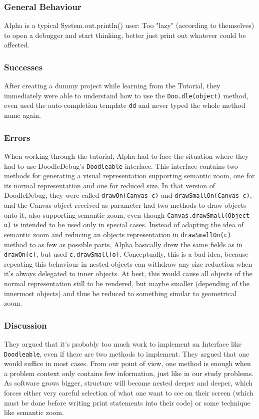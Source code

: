 \documentclass[a4paper,ngerman,english]{amsbook} %
\begin{document}
\subsubsection*{General Behaviour}
Alpha is a typical System.out.println() user: Too "lazy" (according to themselves) to open a debugger and start thinking, better just print out whatever could be affected.
\subsubsection*{Successes}
After creating a dummy project while learning from the Tutorial, they immediately were able to understand how to use the \verb-Doo.dle(object)- method, even used the auto-completion template \verb.dd. and never typed the whole method name again.
\subsubsection*{Errors}
When working through the tutorial, Alpha had to face the situation where they had to use DoodleDebug's \verb.Doodleable. interface. This interface contains two methods for generating a visual representation supporting semantic zoom, one for its normal representation and one for reduced size. In that version of DoodleDebug, they were called \verb.drawOn(Canvas c). and \verb.drawSmallOn(Canvas c)., and the Canvas object received as parameter had two methods to draw objects onto it, also supporting semantic zoom, even though \verb-Canvas.drawSmall(Object o)- is intended to be used only in special cases. Instead of adapting the idea of semantic zoom and reducing an objects representation in \verb.drawSmallOn(c). method to as few as possible parts, Alpha basically drew the same fields as in \verb.drawOn(c)., but used \verb-c.drawSmall(o)-. Conceptually, this is a bad idea, because repeating this behaviour in nested objects can withdraw any size reduction when it's always delegated to inner objects. At best, this would cause all objects of the normal representation still to be rendered, but maybe smaller (depending of the innermost objects) and thus be reduced to something similar to geometrical zoom.
\subsubsection*{Discussion}
They argued that it's probably too much work to implement an Interface like \verb.Doodleable., even if there are two methods to implement. They argued that one would suffice in most cases. From our point of view, one method is enough when a problem context only contains few information, just like in our study problems. As software grows bigger, structure will become nested deeper and deeper, which forces either very careful selection of what one want to see on their screen (which must be done before writing print statements into their code) or some technique like semantic zoom.
\end{document}
